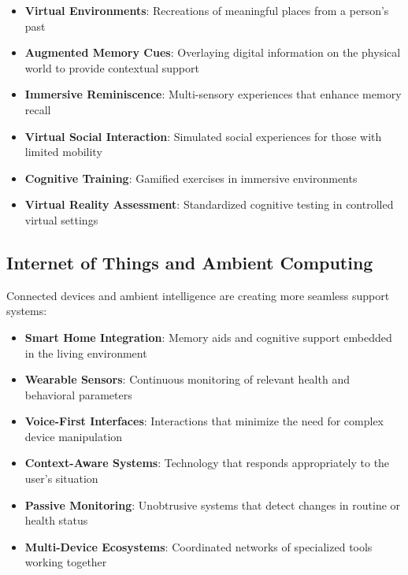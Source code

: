 \begin{itemize}
    \item \textbf{Virtual Environments}: Recreations of meaningful places from a person's past
    
    \item \textbf{Augmented Memory Cues}: Overlaying digital information on the physical world to provide contextual support
    
    \item \textbf{Immersive Reminiscence}: Multi-sensory experiences that enhance memory recall
    
    \item \textbf{Virtual Social Interaction}: Simulated social experiences for those with limited mobility
    
    \item \textbf{Cognitive Training}: Gamified exercises in immersive environments
    
    \item \textbf{Virtual Reality Assessment}: Standardized cognitive testing in controlled virtual settings
\end{itemize}

\subsection{Internet of Things and Ambient Computing}
Connected devices and ambient intelligence are creating more seamless support systems:

\begin{itemize}
    \item \textbf{Smart Home Integration}: Memory aids and cognitive support embedded in the living environment
    
    \item \textbf{Wearable Sensors}: Continuous monitoring of relevant health and behavioral parameters
    
    \item \textbf{Voice-First Interfaces}: Interactions that minimize the need for complex device manipulation
    
    \item \textbf{Context-Aware Systems}: Technology that responds appropriately to the user's situation
    
    \item \textbf{Passive Monitoring}: Unobtrusive systems that detect changes in routine or health status
    
    \item \textbf{Multi-Device Ecosystems}: Coordinated networks of specialized tools working together
\end{itemize}

